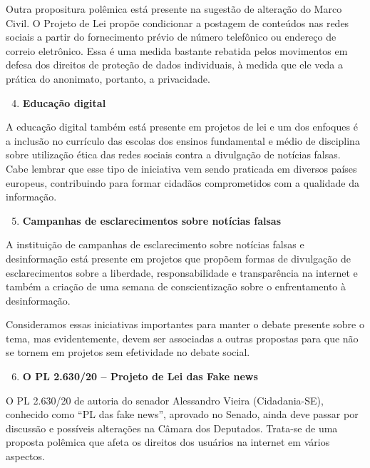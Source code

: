 Outra propositura polêmica está presente na sugestão de alteração do
Marco Civil. O Projeto de Lei propõe condicionar a postagem de conteúdos
nas redes sociais a partir do fornecimento prévio de número telefônico
ou endereço de correio eletrônico. Essa é uma medida bastante rebatida
pelos movimentos em defesa dos direitos de proteção de dados
individuais, à medida que ele veda a prática do anonimato, portanto, a
privacidade.

\begin{enumerate}
\setcounter{enumi}{3}
\item\textbf{Educação digital}
\end{enumerate}

  A educação digital também está presente em projetos de lei e um dos
  enfoques é a inclusão no currículo das escolas dos ensinos fundamental
  e médio de disciplina sobre utilização ética das redes sociais contra
  a divulgação de notícias falsas. Cabe lembrar que esse tipo de
  iniciativa vem sendo praticada em diversos países europeus,
  contribuindo para formar cidadãos comprometidos com a qualidade da
  informação.

\begin{enumerate}
\setcounter{enumi}{4}
\item\textbf{Campanhas de esclarecimentos sobre notícias falsas}
\end{enumerate}


  A instituição de campanhas de esclarecimento sobre notícias falsas e
  desinformação está presente em projetos que propõem formas de
  divulgação de esclarecimentos sobre a liberdade, responsabilidade e
  transparência na internet e também a criação de uma semana de
  conscientização sobre o enfrentamento à desinformação.

  Consideramos essas iniciativas importantes para manter o debate
  presente sobre o tema, mas evidentemente, devem ser associadas a
  outras propostas para que não se tornem em projetos sem efetividade no
  debate social.

\begin{enumerate}
\setcounter{enumi}{5}
\item\textbf{O PL 2.630/20 -- Projeto de Lei das Fake news}
\end{enumerate}

O PL 2.630/20 de autoria do senador Alessandro Vieira (Cidadania-SE),
conhecido como ``PL das fake news'', aprovado no Senado, ainda deve
passar por discussão e possíveis alterações na Câmara dos Deputados.
Trata-se de uma proposta polêmica que afeta os direitos dos usuários na
internet em vários aspectos.

